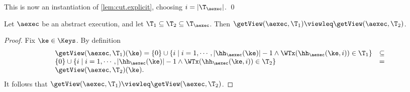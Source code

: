 This is now an instantiation of \cref{lem:cut.explicit}, choosing 
$i = \lvert \T_{\aexec} \rvert$. \qed

%

\begin{lemma}
\label{lem:getView.monotone}
Let $\aexec$ be an abstract execution, and let $\T_1 \subseteq \T_2 \subseteq \T_{\aexec}$. 
Then $\getView(\aexec, \T_1) \viewleq \getView(\aexec, \T_2)$.
\end{lemma}

\begin{proof}
Fix $\ke \in \Keys$. By definition  
\[
\begin{array}{lr}
\getView(\aexec, \T_1)(\ke) = \{0\} \cup \{ i \mid i = 1,\cdots, \lvert \hh_{\aexec}(\ke) \rvert - 1 \wedge \WTx(\hh_{\aexec}(\ke, i)) \in \T_1\} &\subseteq\\
\{0\} \cup \{i \mid i=1,\cdots, \lvert \hh_{\aexec}(\ke) \rvert - 1 \wedge \WTx(\hh_{\aexec}(\ke, i)) \in \T_2\} & = \\
\getView(\aexec, \T_2)(\ke).
\end{array}
\]
It follows that  $\getView(\aexec, \T_1) \viewleq \getView(\aexec, \T_2)$.
\end{proof}

